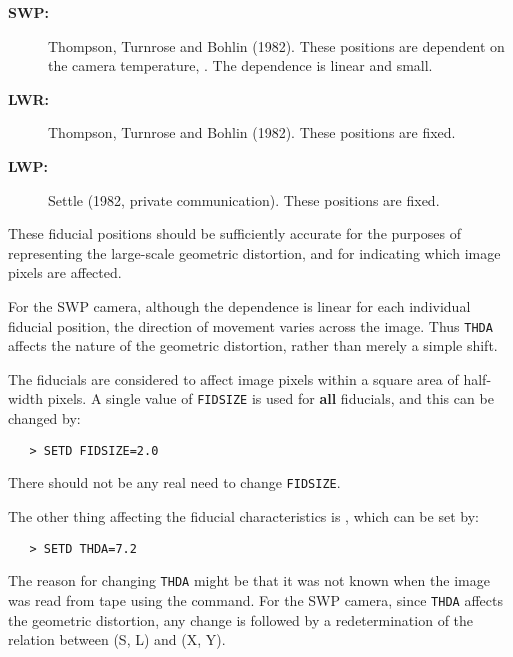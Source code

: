 \begin{description}

\item [{\bf SWP:}]
      Thompson, Turnrose and Bohlin (1982)\@.  These positions are
      dependent on the camera temperature, \@.
      The dependence is linear and small.

\item [{\bf LWR:}]
      Thompson, Turnrose and Bohlin (1982)\@.  These positions are fixed.

\item [{\bf LWP:}]
      Settle (1982, private communication)\@.  These positions are fixed.

\end{description}

These fiducial positions should be sufficiently accurate for the purposes
of representing the large-scale geometric distortion, and for indicating which
image pixels are affected.

For the SWP camera, although the 
 dependence is linear for each
individual fiducial position, the direction of movement varies across the
image.  Thus \verb+THDA+ affects the nature of the geometric distortion, rather
than merely a simple shift.

The fiducials are considered to affect image pixels within a square area
of half-width 
 pixels.  A single value of \verb+FIDSIZE+ is used
for {\bf all} fiducials, and this can be changed by:

\begin{verbatim}
   > SETD FIDSIZE=2.0
\end{verbatim}

There should not be any real need to change \verb+FIDSIZE+\@.

The other thing affecting the fiducial characteristics is
, which can be set by:

\begin{verbatim}
   > SETD THDA=7.2
\end{verbatim}

The reason for changing \verb+THDA+ might be that it was not known when the
image was read from tape using the 
 command.  For the SWP camera,
since \verb+THDA+ affects the geometric distortion, any change is followed by a
redetermination of the relation between (S, L) and (X, Y)\@.

